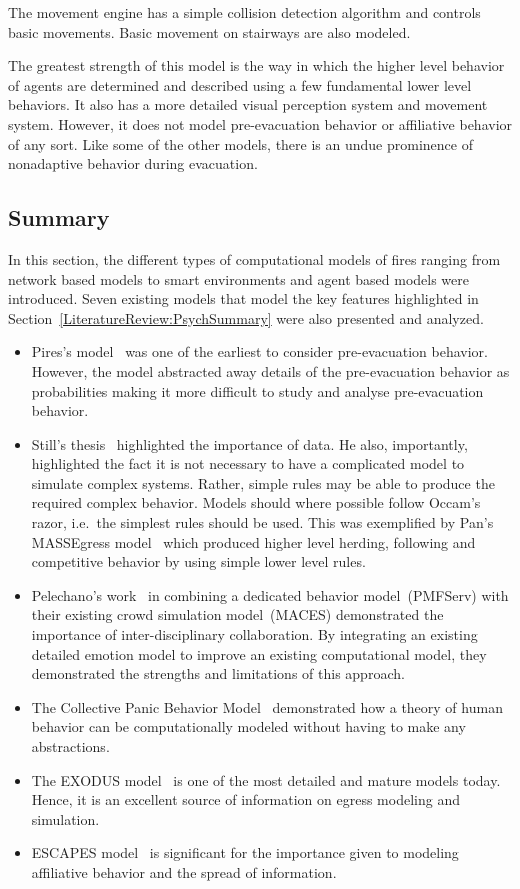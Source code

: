 The movement engine has a simple collision detection algorithm and controls basic movements. Basic movement on stairways are also modeled.

The greatest strength of this model is the way in which the higher level behavior of agents are determined and described using a few fundamental lower level behaviors. It also has a more detailed visual perception system and movement system. However, it does not model pre-evacuation behavior or affiliative behavior of any sort. Like some of the other models, there is an undue prominence of nonadaptive behavior during evacuation.

\subsection{Summary}
\label{LiteratureReview:EngineeringSummary}
In this section, the different types of computational models of fires ranging from network based models to smart environments and agent based models were introduced. Seven existing models that model the key features highlighted in Section~\ref{LiteratureReview:PsychSummary} were also presented and analyzed.
\begin{itemize}
	\item Pires's model~\cite{Pires:2005gs} was one of the earliest to consider pre-evacuation behavior. However, the model abstracted away details of the pre-evacuation behavior as probabilities making it more difficult to study and analyse pre-evacuation behavior.
	\item Still's thesis~\cite{Still:2000tp} highlighted the importance of data. He also, importantly, highlighted the fact it is not necessary to have a complicated model to simulate complex systems. Rather, simple rules may be able to produce the required complex behavior. Models should where possible follow Occam's razor, i.e.\ the simplest rules should be used. This was exemplified by Pan's MASSEgress model~\cite{Pan:2007gb} which produced higher level herding, following and competitive behavior by using simple lower level rules.
	\item Pelechano's work~\cite{Pelechano:2005vp} in combining a dedicated behavior model~(PMFServ) with their existing crowd simulation model~(MACES) demonstrated the importance of inter-disciplinary collaboration. By integrating an existing detailed emotion model to improve an existing computational model, they demonstrated the strengths and limitations of this approach.
	\item The Collective Panic Behavior Model~\cite{Franca:2009wq} demonstrated how a theory of human behavior can be computationally modeled without having to make any abstractions.
	\item The EXODUS model~\cite{Owen:1996jh} is one of the most detailed and mature models today. Hence, it is an excellent source of information on egress modeling and simulation.
	\item ESCAPES model~\cite{Tsai:2011tz} is significant for the importance given to modeling affiliative behavior and the spread of information.
\end{itemize}

